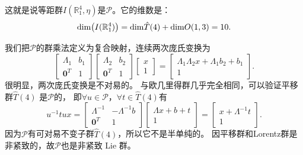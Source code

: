 这就是说等距群$I(\mathbb{R}^4_1,\eta)$是$\mathcal{P}$。它的维数是：
\begin{equation}
    {\rm dim}\bigl(I(\mathbb{R}^4_1)\bigr)= {\rm dim}  \hat{T}(4) + {\rm dim} O(1,3) = 10 .
\end{equation}


我们把$\mathcal{P}$的群乘法定义为复合映射，连续两次庞氏变换为
\begin{equation}\label{chlg:eqn_tmpptp}
    \begin{bmatrix}  \Lambda_1 & b_1 \\ \boldsymbol{0}^T & 1  \end{bmatrix}
    \begin{bmatrix}  \Lambda_2 & b_2 \\ \boldsymbol{0}^T & 1  \end{bmatrix}
    \begin{bmatrix}  x \\ 1 \end{bmatrix} 
    =\begin{bmatrix} \Lambda_1 \Lambda_2 x + \Lambda_1 b_2 + b_1 \\  1  \end{bmatrix}.
\end{equation}
很明显，两次庞氏变换是不对易的。
与欧几里得群几乎完全相同，可以验证平移群$\hat{T}(4)$
是$\mathcal{P}$的，
即$\forall u \in \mathcal{P}$，$\forall t \in \hat{T}(4)$有
\begin{equation}
    u^{-1} t u x= 
    \begin{bmatrix}  \Lambda^{-1} & -\Lambda^{-1} b \\ \boldsymbol{0}^T & 1    \end{bmatrix}
    \begin{bmatrix}  \Lambda x + b + t\\  1  \end{bmatrix}
    =\begin{bmatrix} x + \Lambda^{-1} t\\  1  \end{bmatrix}.
\end{equation}
因为$\mathcal{P}$有可对易不变子群$\hat{T}(4)$，所以它不是半单纯的。
因平移群和Lorentz群是非紧致的，故$\mathcal{P}$也是非紧致 Lie 群。

